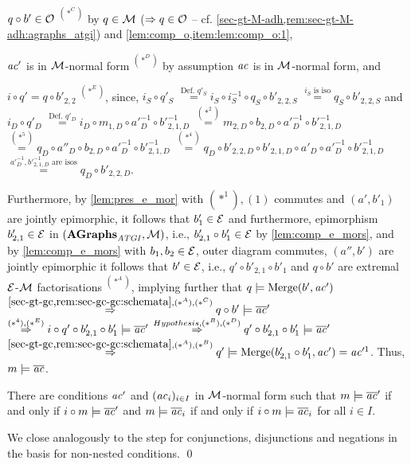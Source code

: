 \begin{description}
\begin{description}
\begin{enumerate*}
\item $q \circ b' \in {\cal O}$ $^{(*^C)}$ by $q \in {\cal M}$ ($\Rightarrow q \in {\cal O}$ -- cf. \cref{sec-gt-M-adh,rem:sec-gt-M-adh:agraphs_atgi}) and \cref{lem:comp_o,item:lem:comp_o:1},
\item $\mathit{ac}'$ is in ${\cal M}$-normal form $^{(*^D)}$ by assumption $\mathit{ac}$ is in ${\cal M}$-normal form, and
\item $i \circ q'=q \circ b'_{2,2}$ $^{(*^E)}$, since, $i_S \circ q'_S$ $\stackrel{\text{Def. }q'_S}{=} i_S \circ i^{-1}_S \circ q_S \circ b'_{2,2,S}$ $\stackrel{i_S\text{ is iso}}{=} q_S \circ b'_{2,2,S}$ and $i_D \circ q'_D$ $\stackrel{\text{Def. }q'_D}{=} i_D \circ m_{1,D} \circ a'^{-1}_D \circ b'^{-1}_{2,1,D}$ $\stackrel{(*^2)}{=} m_{2,D} \circ b_{2,D} \circ a'^{-1}_D \circ b'^{-1}_{2,1,D}$ $\stackrel{(*^5)}{=} q_D \circ a''_D \circ b_{2,D} \circ a'^{-1}_D \circ b'^{-1}_{2,1,D}$ $\stackrel{(*^4)}{=} q_D \circ b'_{2,2,D} \circ b'_{2,1,D} \circ a'_D \circ a'^{-1}_D \circ b'^{-1}_{2,1,D}$ $\stackrel{a'^{-1}_D,b'^{-1}_{2,1,D}\text{ are isos}}{=} q_D \circ b'_{2,2,D}$.
\end{enumerate*}
Furthermore, by \cref{lem:pres_e_mor} with $(*^1),(1)$ commutes and $(a',b'_1)$ are jointly epimorphic, it follows that $b'_1 \in \mathcal{E}$ and furthermore, epimorphism $b'_{2,1} \in \mathcal{E}$ in $(\mathbf{AGraphs}_\mathit{ATGI},{\cal M})$, i.e., $b'_{2,1} \circ b'_1 \in \mathcal{E}$ by \cref{lem:comp_e_mors}, and by \cref{lem:comp_e_mors} with $b_1,b_2 \in \mathcal{E}$, outer diagram commutes, $(a'',b')$ are jointly epimorphic it follows that $b' \in \mathcal{E}$, i.e., $q' \circ b'_{2,1} \circ b'_1$ and $q \circ b'$ are extremal $\mathcal{E}$-${\cal M}$ factorisations $^{(*^A)}$, implying further that $q \models \mathrm{Merge}(b',\mathit{ac}')$ $\stackrel{\cref{sec-gt-gc,rem:sec-gc-gc:schemata},(*^A),(*^C)}{\Rightarrow} q \circ b' \models \ol{\ac}'$ $\stackrel{(*^4),(*^E)}{\Rightarrow} i \circ q' \circ b'_{2,1} \circ b'_1 \models \overline{\mathit{ac}}'$ $\stackrel{Hypothesis,(*^B),(*^D)}{\Rightarrow} q' \circ b'_{2,1} \circ b'_1 \models \overline{\mathit{ac}}'$ $\stackrel{\cref{sec-gt-gc,rem:sec-gc-gc:schemata},(*^A),(*^B)}{\Rightarrow} q' \models \Merge(b'_{2,1} \circ b'_1,\ac')=\ac'^1$.
Thus, $m \models \overline{\mathit{ac}}$.
\end{description}
\item[(hypothesis)] There are conditions $\mathit{ac}'$ and $(\mathit{ac}_i)_{i \in I}$ in ${\cal M}$-normal form such that $m \models \overline{\mathit{ac}}'$ if and only if $i \circ m\models \overline{\mathit{ac}}'$ and $m \models \overline{\mathit{ac}}_i$ if and only if $i \circ m\models \overline{\mathit{ac}}_i$ for all $i \in I$.\thispagestyle{plain}
\item[(step $\ac=\wedge_{i \in I}(\ac_i)$, $\ac=\vee_{i \in I}(\ac_i)$ and $\ac=\neg \ac'$)]
We close analogously to the step for conjunctions, disjunctions and negations in the basis for non-nested conditions.
\qed
\end{description}

